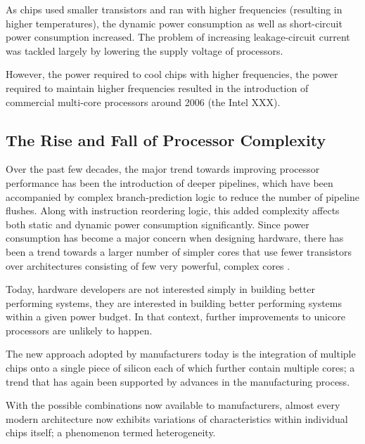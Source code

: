 As chips used smaller transistors and ran with higher frequencies (resulting in higher temperatures), the dynamic power consumption as well as short-circuit power consumption increased. The problem of increasing leakage-circuit current was tackled largely by lowering the supply voltage of processors.

However, the power required to cool chips with higher frequencies, the power required to maintain higher frequencies resulted in the introduction of commercial multi-core processors around 2006 (the Intel XXX).

\subsection{The Rise and Fall of Processor Complexity}

Over the past few decades, the major trend towards improving processor performance has been the introduction of deeper pipelines, which have been accompanied by complex branch-prediction logic to reduce the number of pipeline flushes. Along with instruction reordering logic, this added complexity affects both static and dynamic power consumption significantly. Since power consumption has become a major concern when designing hardware, there has been a trend towards a larger number of simpler cores that use fewer transistors \cite{many-core} over architectures consisting of few very powerful, complex cores \cite{multi-core}.

Today, hardware developers are not interested simply in building better performing systems, they are interested in building better performing systems within a given power budget. In that context, further improvements to unicore processors are unlikely to happen.

The new approach adopted by manufacturers today is the integration of multiple chips onto a single piece of silicon each of which further contain multiple cores; a trend that has again been supported by advances in the manufacturing process.

With the possible combinations now available to manufacturers, almost every modern architecture now exhibits variations of characteristics within individual chips itself; a phenomenon termed heterogeneity.

